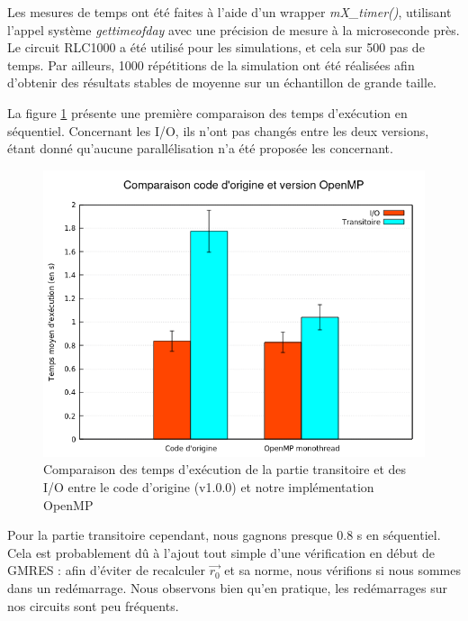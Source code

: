 \documentclass[11pt,a4paper,oneside]{memoir}
\theoremstyle{definition}
\theoremstyle{remark}
\theoremstyle{plain}
\begin{document}
Les mesures de temps ont été faites à l'aide d'un wrapper \textit{mX\_timer()}, utilisant l'appel système \textit{gettimeofday} avec une précision de mesure à la microseconde près. Le circuit RLC1000 a été utilisé pour les simulations, et cela sur 500 pas de temps. Par ailleurs, 1000 répétitions de la simulation ont été réalisées afin d'obtenir des résultats stables de moyenne sur un échantillon de grande taille.\bigskip

La figure \ref{comparaison_OpenMP} présente une première comparaison des temps d'exécution en séquentiel. Concernant les I/O, ils n'ont pas changés entre les deux versions, étant donné qu'aucune parallélisation n'a été proposée les concernant.

\begin{figure}
\begin{center}
\includegraphics[scale=0.6]{Images-Rapport/Version_OpenMP/Comparaison_code_origine_et_OpenMP.png}
\caption{Comparaison des temps d'exécution de la partie transitoire et des I/O entre le code d'origine (v1.0.0) et notre implémentation OpenMP}
\label{comparaison_OpenMP}
\end{center}
\end{figure}

Pour la partie transitoire cependant, nous gagnons presque 0.8 s en séquentiel. Cela est probablement dû à l'ajout tout simple d'une vérification en début de GMRES : afin d'éviter de recalculer $\vec{r_0}$ et sa norme, nous vérifions si nous sommes dans un redémarrage. Nous observons bien qu'en pratique, les redémarrages sur nos circuits sont peu fréquents.\medskip
\end{document}
